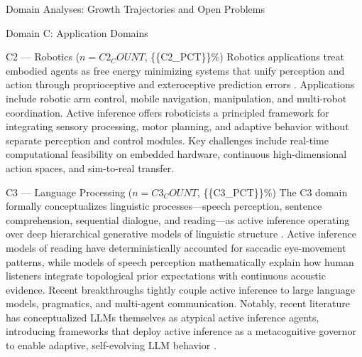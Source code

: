 \documentclass[
  ignorenonframetext,
]{beamer}
\begin{document}
\begin{frame}{Domain Analyses: Growth Trajectories and Open Problems
\label{sec:subfield_analyses}}
\begin{block}{Domain C: Application Domains}
\begin{block}{C2 --- Robotics (\(n = {{C2_COUNT}}\), \{\{C2\_PCT\}\}\%)}
\protect{}\label{c2-robotics-n-c2_count-c2_pct}
Robotics applications treat embodied agents as free energy minimizing
systems that unify perception and action through proprioceptive and
exteroceptive prediction errors \citep{lanillos2021active}. Applications
include robotic arm control, mobile navigation, manipulation, and
multi-robot coordination. Active inference offers roboticists a
principled framework for integrating sensory processing, motor planning,
and adaptive behavior without separate perception and control modules.
Key challenges include real-time computational feasibility on embedded
hardware, continuous high-dimensional action spaces, and sim-to-real
transfer.
\end{block}

\begin{block}{C3 --- Language Processing (\(n = {{C3_COUNT}}\),
\{\{C3\_PCT\}\}\%)}
\protect{}\label{c3-language-processing-n-c3_count-c3_pct}
The C3 domain formally conceptualizes linguistic processes---speech
perception, sentence comprehension, sequential dialogue, and
reading---as active inference operating over deep hierarchical
generative models of linguistic structure \citep{friston2020generative}.
Active inference models of reading have deterministically accounted for
saccadic eye-movement patterns, while models of speech perception
mathematically explain how human listeners integrate topological prior
expectations with continuous acoustic evidence. Recent breakthroughs
tightly couple active inference to large language models, pragmatics,
and multi-agent communication. Notably, recent literature has
conceptualized LLMs themselves as atypical active inference agents,
introducing frameworks that deploy active inference as a metacognitive
governor to enable adaptive, self-evolving LLM behavior
\citep{heins2024active}.
\end{block}


\end{block}
\end{frame}
\end{document}
